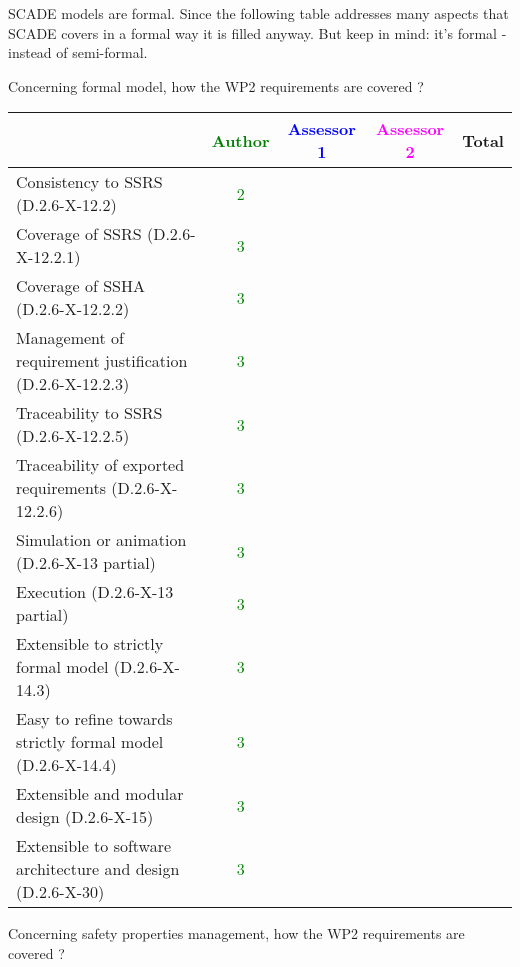 \begin{author_comment}
SCADE models are formal. Since the following table addresses many aspects that SCADE covers in a formal way it is filled anyway. But keep in mind: it's formal - instead of semi-formal.  
\end{author_comment}


Concerning formal model, how the WP2 requirements are covered ?

\begin{tabular}{|l | c | c | c | c|}
\hline
& \textcolor{green}{Author} & \textcolor{blue}{Assessor 1} & \textcolor{magenta}{Assessor 2} & Total \\
\hline 
Consistency to SSRS (D.2.6-X-12.2) & \textcolor{green}{2} & & &  \\
\hline
Coverage of SSRS (D.2.6-X-12.2.1)  & \textcolor{green}{3} & & &  \\
\hline
Coverage of SSHA (D.2.6-X-12.2.2)  &  \textcolor{green}{3}& & &  \\
\hline
Management of requirement justification (D.2.6-X-12.2.3)  &  \textcolor{green}{3}& & &  \\
\hline
Traceability to  SSRS (D.2.6-X-12.2.5)  &  \textcolor{green}{3}& & &  \\
\hline
Traceability of exported requirements (D.2.6-X-12.2.6)  &  \textcolor{green}{3}& & &  \\
\hline
Simulation or animation (D.2.6-X-13 partial)  &  \textcolor{green}{3}& & &  \\
\hline
Execution (D.2.6-X-13 partial)  & \textcolor{green}{3} & & &  \\
\hline
Extensible to strictly formal model (D.2.6-X-14.3) & \textcolor{green}{3}  & & &  \\
\hline
Easy to  refine towards strictly formal model (D.2.6-X-14.4) & \textcolor{green}{3} & & &  \\
\hline
Extensible and modular design (D.2.6-X-15)  & \textcolor{green}{3} & & &  \\
\hline
Extensible to software architecture and design (D.2.6-X-30)   &  \textcolor{green}{3}& & &  \\
\hline
\end{tabular}

Concerning safety properties management, how the WP2 requirements are covered ?

